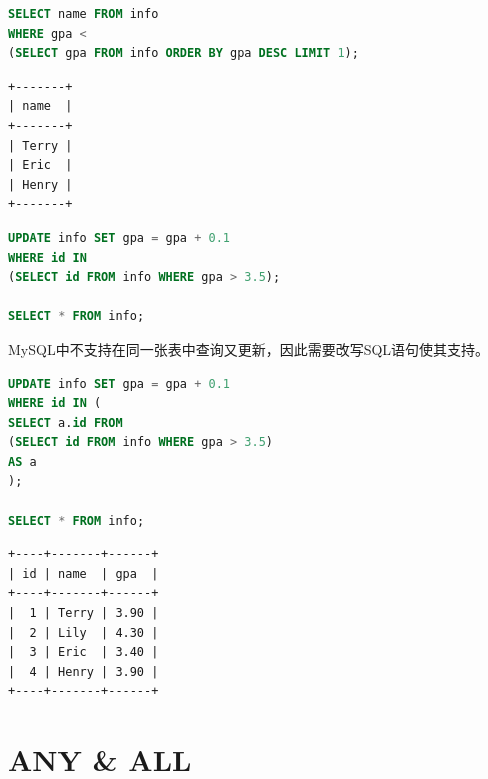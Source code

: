 \documentclass[12pt, openany, oneside]{book}
\begin{document}

\begin{lstlisting}[language=SQL]
SELECT name FROM info
WHERE gpa <
(SELECT gpa FROM info ORDER BY gpa DESC LIMIT 1);
\end{lstlisting}

\begin{tcolorbox}
	\begin{verbatim}
+-------+
| name  |
+-------+
| Terry |
| Eric  |
| Henry |
+-------+
	\end{verbatim}
\end{tcolorbox}

\vspace{0.5cm}


\begin{lstlisting}[language=SQL]
UPDATE info SET gpa = gpa + 0.1
WHERE id IN
(SELECT id FROM info WHERE gpa > 3.5);

SELECT * FROM info;
\end{lstlisting}

MySQL中不支持在同一张表中查询又更新，因此需要改写SQL语句使其支持。\\


\begin{lstlisting}[language=SQL]
UPDATE info SET gpa = gpa + 0.1
WHERE id IN (
SELECT a.id FROM
(SELECT id FROM info WHERE gpa > 3.5)
AS a
);

SELECT * FROM info;
\end{lstlisting}

\begin{tcolorbox}
	\begin{verbatim}
+----+-------+------+
| id | name  | gpa  |
+----+-------+------+
|  1 | Terry | 3.90 |
|  2 | Lily  | 4.30 |
|  3 | Eric  | 3.40 |
|  4 | Henry | 3.90 |
+----+-------+------+
	\end{verbatim}
\end{tcolorbox}

\newpage

\chapter{ANY \& ALL}

\vspace{0.5cm}
\end{document}
